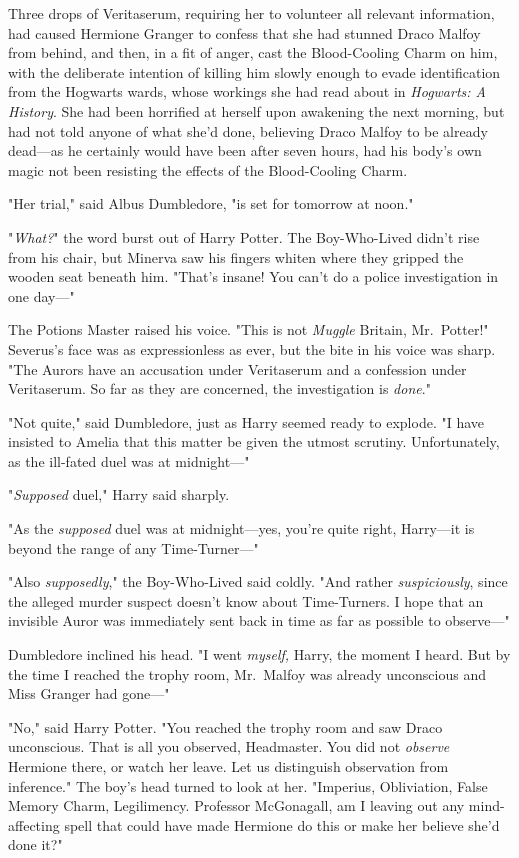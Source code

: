 Three drops of Veritaserum, requiring her to volunteer all relevant
information, had caused Hermione Granger to confess that she had stunned Draco
Malfoy from behind, and then, in a fit of anger, cast the Blood-Cooling Charm
on him, with the deliberate intention of killing him slowly enough to evade
identification from the Hogwarts wards, whose workings she had read about in
\emph{Hogwarts: A History}. She had been horrified at herself upon awakening
the next morning, but had not told anyone of what she'd done, believing Draco
Malfoy to be already dead---as he certainly would have been after seven hours,
had his body's own magic not been resisting the effects of the Blood-Cooling
Charm.

"Her trial," said Albus Dumbledore, "is set for tomorrow at noon."

"\emph{What?}" the word burst out of Harry Potter. The Boy-Who-Lived didn't
rise from his chair, but Minerva saw his fingers whiten where they gripped the
wooden seat beneath him. "That's insane! You can't do a police investigation in
one day---"

The Potions Master raised his voice. "This is not \emph{Muggle} Britain,
Mr.~Potter!" Severus's face was as expressionless as ever, but the bite in his
voice was sharp. "The Aurors have an accusation under Veritaserum and a
confession under Veritaserum. So far as they are concerned, the investigation
is \emph{done}."

"Not quite," said Dumbledore, just as Harry seemed ready to explode. "I have
insisted to Amelia that this matter be given the utmost scrutiny.
Unfortunately, as the ill-fated duel was at midnight---"

"\emph{Supposed} duel," Harry said sharply.

"As the \emph{supposed} duel was at midnight---yes, you're quite right,
Harry---it is beyond the range of any Time-Turner---"

"Also \emph{supposedly}," the Boy-Who-Lived said coldly. "And rather
\emph{suspiciously}, since the alleged murder suspect doesn't know about
Time-Turners. I hope that an invisible Auror was immediately sent back in time
as far as possible to observe---"

Dumbledore inclined his head. "I went \emph{myself,} Harry, the moment I heard.
But by the time I reached the trophy room, Mr.~Malfoy was already unconscious
and Miss Granger had gone---"

"No," said Harry Potter. "You reached the trophy room and saw Draco
unconscious. That is all you observed, Headmaster. You did not \emph{observe}
Hermione there, or watch her leave. Let us distinguish observation from
inference." The boy's head turned to look at her. "Imperius, Obliviation, False
Memory Charm, Legilimency. Professor McGonagall, am I leaving out any
mind-affecting spell that could have made Hermione do this or make her believe
she'd done it?"

